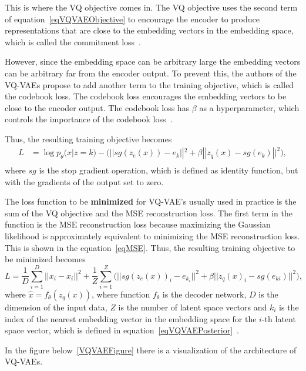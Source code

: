 This is where the VQ objective comes in. The VQ objective uses the second term of equation~\ref{eqVQVAEObjective} to encourage the encoder to produce representations that are close to the embedding vectors in the embedding space, which is called the commitment loss~\cite{vqvae}.

However, since the embedding space can be arbitrary large the embedding vectors can be arbitrary far from the encoder output. To prevent this, the authors of the VQ-VAEs propose to add another term to the training objective, which is called the codebook loss. The codebook loss encourages the embedding vectors to be close to the encoder output. The codebook loss has $\beta$ as a hyperparameter, which controls the importance of the codebook loss~\cite{vqvae}.

Thus, the resulting training objective becomes
\begin{equation} \label{eqVQVAEObjective}
    \begin{split}
        L &= \log p_{\theta}(x|z = k) - \biggl( || sg(z_e(x)) - e_k ||^2 + \beta || z_q(x) - sg(e_k) ||^2 \biggr),\\
    \end{split}
\end{equation}
where $sg$ is the stop gradient operation, which is defined as identity function, but with the gradients of the output set to zero.

The loss function to be \textbf{minimized} for VQ-VAE's usually used in practice is the sum of the VQ objective and the MSE reconstruction loss.
The first term in the function is the MSE reconstruction loss because maximizing the Gaussian likelihood is approximately equivalent to minimizing the MSE reconstruction loss. This is shown in the equation~\ref{eqMSE}. 
Thus, the resulting training objective to be minimized becomes
\[ L = \frac{1}{D} \sum_{i=1}^{D} ||x_i - \hat{x}_i ||^2 + \frac{1}{Z} \sum_{i=1}^{Z} \biggl( || sg(z_e(x))_i - e_{k_{i}} ||^2 + \beta || z_q(x)_i -  sg(e_{k{i}}) ||^2 \biggr), \]
where $\hat{x} = f_{\theta}(z_q(x))$, where function $f_{\theta}$ is the decoder network, $D$ is the dimension of the input data, $Z$ is the number of latent space vectors and $k_{i}$ is the index of the nearest embedding vector in the embedding space for the $i$-th latent space vector, which is defined in equation~\ref{eqVQVAEPosterior}~\cite{vqvae}.

In the figure below~\ref{VQVAEFigure} there is a visualization of the architecture of VQ-VAEs.

